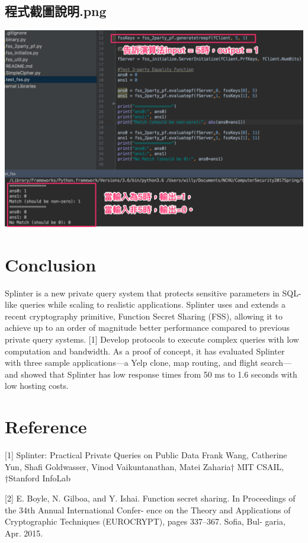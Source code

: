 \documentclass[12pt,a4paper]{article}
\begin{document}
\begin{multicols}{2}
\subsection{程式截圖說明.png}
\includegraphics[scale=0.25]{程式截圖說明.png}


\section{Conclusion}
Splinter is a new private query system that protects sensitive parameters in SQL-like queries while scaling to realistic applications. Splinter uses and extends a recent cryptography primitive, Function Secret Sharing (FSS), allowing it to achieve up to an order of magnitude better performance compared to previous private query systems. [1] Develop protocols to execute complex queries with low computation and bandwidth. As a proof of concept, it has evaluated Splinter with three sample applications—a Yelp clone, map routing, and flight search—and showed that Splinter has low response times from 50 ms to 1.6 seconds with low hosting costs.

\section{Reference}
[1] Splinter: Practical Private Queries on Public 
Data Frank Wang, Catherine Yun, Shafi Goldwasser, 
Vinod Vaikuntanathan, Matei Zaharia† MIT CSAIL, 
†Stanford InfoLab

[2] E. Boyle, N. Gilboa, and Y. Ishai. Function 
secret sharing. In Proceedings of the 34th Annual 
International Confer- ence on the Theory and 
Applications of Cryptographic Techniques 
(EUROCRYPT), pages 337–367. Sofia, Bul- garia, Apr. 
2015.


\end{multicols}
\end{document}
